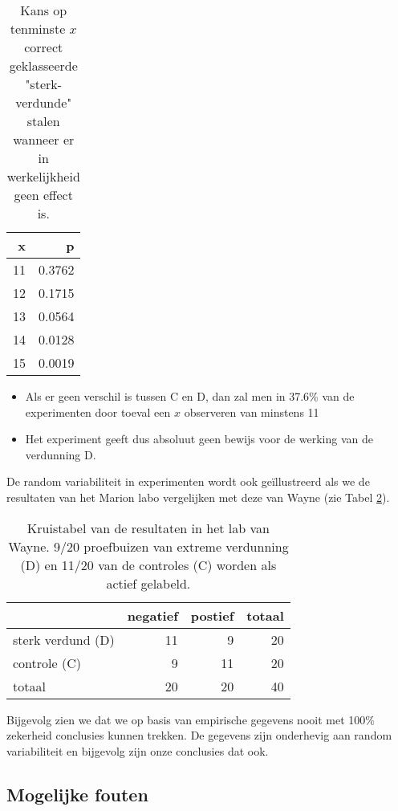 \documentclass[12pt,dutch,coursenotes]{book}
\providecommand{\tightlist}{%
  \setlength{\itemsep}{0pt}\setlength{\parskip}{0pt}}
\theoremstyle{definition}
\theoremstyle{definition}
\theoremstyle{definition}
\theoremstyle{remark}
\begin{document}
\begin{table}

\caption{\label{tab:pValTableH1}Kans op tenminste $x$ correct geklasseerde "sterk-verdunde" stalen wanneer er in werkelijkheid geen effect is.}
\centering
\begin{tabular}[t]{rr}
\toprule
x & p\\
\midrule
11 & 0.3762\\
12 & 0.1715\\
13 & 0.0564\\
14 & 0.0128\\
15 & 0.0019\\
\bottomrule
\end{tabular}
\end{table}

\begin{itemize}
\tightlist
\item
  Als er geen verschil is tussen C en D, dan zal men in 37.6\% van de
  experimenten door toeval een \(x\) observeren van minstens 11
\item
  Het experiment geeft dus absoluut geen bewijs voor de werking van de
  verdunning D.
\end{itemize}

De random variabiliteit in experimenten wordt ook geïllustreerd als we
de resultaten van het Marion labo vergelijken met deze van Wayne (zie
Tabel \ref{tab:kruistabelWayne}).

\begin{table}

\caption{\label{tab:kruistabelWayne}Kruistabel van de resultaten in het lab van Wayne. 9/20 proefbuizen van extreme verdunning (D) en 11/20 van de controles (C) worden als actief gelabeld.}
\centering
\begin{tabular}[t]{lrrr}
\toprule
  & negatief & postief & totaal\\
\midrule
sterk verdund (D) & 11 & 9 & 20\\
controle (C) & 9 & 11 & 20\\
totaal & 20 & 20 & 40\\
\bottomrule
\end{tabular}
\end{table}

Bijgevolg zien we dat we op basis van empirische gegevens nooit met
100\% zekerheid conclusies kunnen trekken. De gegevens zijn onderhevig
aan random variabiliteit en bijgevolg zijn onze conclusies dat ook.

\subsection{Mogelijke fouten}\label{mogelijke-fouten}
\end{document}

